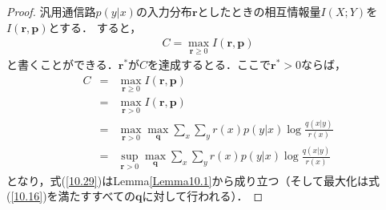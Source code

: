 \documentclass{ltjsarticle}
\theoremstyle{definition}
\begin{document}
\begin{proof}
  汎用通信路$p(y|x)$の入力分布$\mathbf{r}$としたときの相互情報量$I(X;Y)$を$I(\mathbf{r}, \mathbf{p})$とする．
  すると，
  \begin{eqnarray}
    \label{10.26}
    C = \max_{\mathbf{r} \geq 0} I (\mathbf{r}, \mathbf{p})
  \end{eqnarray}
  と書くことができる．$\mathbf{r}^*$が$C$を達成するとる．ここで$\mathbf{r}^* > 0$ならば，
  \begin{eqnarray}
    \label{10.27}
    C &=& \max_{\mathbf{r} \geq 0} I(\mathbf{r}, \mathbf{p}) \\
    \label{10.28}
    &=& \max_{\mathbf{r} > 0} I(\mathbf{r}, \mathbf{p}) \\
    \label{10.29}
    &=& \max_{\mathbf{r} > 0} \max_{\mathbf{q}} \sum_{x} \sum_{y} r(x) p(y|x) \log \frac{q(x|y)}{r(x)} \\
    \label{10.30}
    &=& \sup_{\mathbf{r} > 0} \max_{\mathbf{q}} \sum_{x} \sum_{y} r(x) p(y|x) \log \frac{q(x|y)}{r(x)}
  \end{eqnarray}
  となり，式(\ref{10.29})はLemma\ref{Lemma10.1}から成り立つ（そして最大化は式(\ref{10.16})を満たすすべての$\mathbf{q}$に対して行われる）．


\end{proof}
\end{document}
